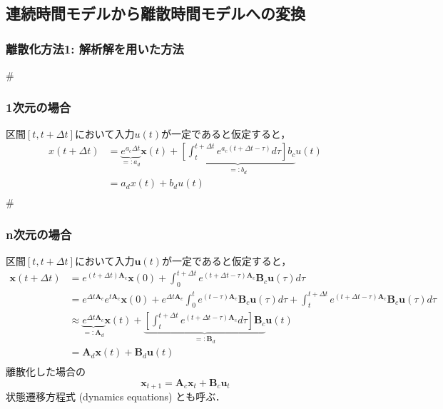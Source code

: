 \subsection{連続時間モデルから離散時間モデルへの変換}\subsubsection{離散化方法1: 解析解を用いた方法}#\subsubsection{1次元の場合}区間$[t, t+\Delta t]$において入力$u(t)$が一定であると仮定すると，
$$
\begin{aligned}
x(t+\Delta t)&= \underbrace{e^{a_c \Delta t}}_{=: a_d}\mathbf{x}(t)+\underbrace{\left[\int_t^{t+\Delta t} e^{a_c(t+\Delta t-\tau)} d\tau\right] b_c}_{=: b_d}u(t)\\
&=a_d x(t)+b_d u(t)\\
\end{aligned}
$$
#\subsubsection{n次元の場合}区間$[t, t+\Delta t]$において入力$\mathbf{u}(t)$が一定であると仮定すると，
$$
\begin{aligned}
\mathbf{x}(t+\Delta t)&=e^{(t+\Delta t)\mathbf{A}_c}\mathbf{x}(0)+\int_0^{t+\Delta t} e^{(t+\Delta t-\tau)\mathbf{A}_c}\mathbf{B}_c\mathbf{u}(\tau) d\tau\\
&=e^{\Delta t\mathbf{A}_c}e^{t\mathbf{A}_c}\mathbf{x}(0)+e^{\Delta t\mathbf{A}_c}\int_0^{t} e^{(t-\tau)\mathbf{A}_c}\mathbf{B}_c\mathbf{u}(\tau) d\tau + \int_t^{t+\Delta t} e^{(t+\Delta t-\tau)\mathbf{A}_c}\mathbf{B}_c\mathbf{u}(\tau) d\tau\\
&\approx \underbrace{e^{\Delta t\mathbf{A}_c}}_{=: \mathbf{A}_d}\mathbf{x}(t)+\underbrace{\left[\int_t^{t+\Delta t} e^{(t+\Delta t-\tau)\mathbf{A}_c} d\tau\right] \mathbf{B}_c}_{=: \mathbf{B}_d}\mathbf{u}(t)\\
&=\mathbf{A}_d\mathbf{x}(t)+\mathbf{B}_d\mathbf{u}(t)\\
\end{aligned}
$$
離散化した場合の
$$
\mathbf{x}_{t+1} = \mathbf{A}_c\mathbf{x}_t + \mathbf{B}_c\mathbf{u}_t
$$
状態遷移方程式 (dynamics equations) とも呼ぶ．
